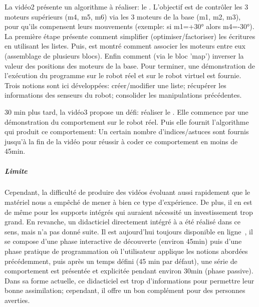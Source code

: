                 La vidéo2 présente un algorithme à réaliser: le . L'objectif est de contrôler les 3 moteurs supérieurs (m4, m5, m6) via les 3 moteurs de la base (m1, m2, m3), pour qu'ils compensent leurs mouvements (exemple: si m1=+30° alors m4=-30°). La première étape présente comment simplifier (optimiser/factoriser) les écritures en utilisant les listes. Puis, est montré comment associer les moteurs entre eux (assemblage de plusieurs blocs). Enfin comment (via le bloc 'map') inverser la valeur des positions des moteurs de la base. Pour terminer, une démonstration de l'exécution du programme sur le robot réel et sur le robot virtuel est fournie. Trois notions sont ici développées: créer/modifier une liste; récupérer les informations des senseurs du robot; consolider les manipulations précédentes.\par%
                30 min plus tard, la vidéo3 propose un défi: réaliser le . Elle commence par une démonstration du comportement sur le robot réel. Puis elle fournit l'algorithme qui produit ce comportement:  Un certain nombre d'indices/astuces sont fournis jusqu'à la fin de la vidéo pour réussir à coder ce comportement en moins de 45min.
            \subparagraph{Limite}    
                Cependant, la difficulté de produire des vidéos évoluant aussi rapidement que le matériel  nous a empêché de mener à bien ce type d'expérience. De plus, il en est de même pour les supports intégrés qui  auraient nécessité un investissement trop grand. En revanche, un didacticiel directement intégré à  a été réalisé dans ce sens, mais n'a pas donné suite. Il est aujourd'hui toujours disponible en ligne~, il se compose d'une phase interactive de découverte (environ 45min) puis d'une phase pratique de programmation où l'utilisateur applique les notions abordées précédemment, puis après un temps défini (45 min par défaut), une série de comportement est présentée et explicitée pendant environ 30min (phase passive). Dans sa forme actuelle, ce didacticiel est trop  d'informations pour permettre leur bonne assimilation; cependant, il offre un bon complément pour des personnes averties. 
